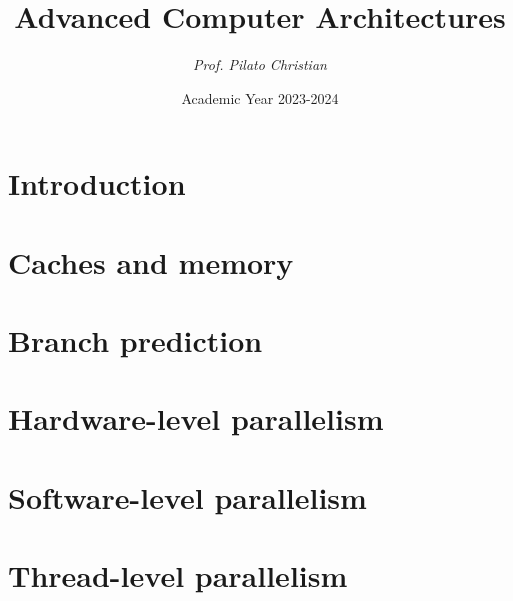 \documentclass[12pt, a4paper]{report}
\title{\textbf{Advanced Computer Architectures}}
\author{\textit{Prof. Pilato Christian}}
\date{Academic Year 2023-2024}
\begin{document}
    \maketitle

    

    \cleardoublepage

    \tableofcontents

    \cleardoublepage

    \chapter{Introduction}
    
    
    
    

    \chapter{Caches and memory}
    
    
    
    

    \chapter{Branch prediction}
    
    
    

    \chapter{Hardware-level parallelism}
    
        
        
    
    
    
    
    

    \chapter{Software-level parallelism}
    
    

    \chapter{Thread-level parallelism}
    
    
    
    
\end{document}
